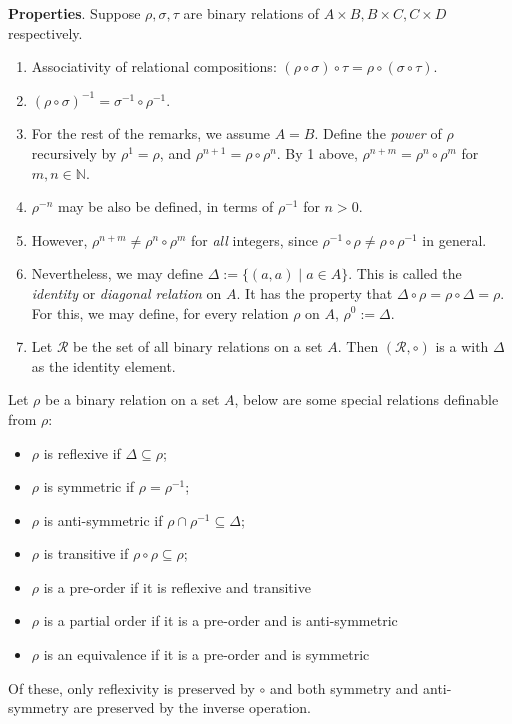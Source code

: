 \documentclass[12pt]{article}
\begin{document}
\textbf{Properties}.
Suppose $\rho,\sigma,\tau$ are binary relations of $A\times B,B\times C,C\times D$ respectively.
\begin{enumerate}
\item Associativity of relational compositions: $(\rho\circ\sigma)\circ \tau =\rho\circ (\sigma\circ\tau)$.
\item $(\rho\circ\sigma)^{-1}=\sigma^{-1}\circ\rho^{-1}$.
\item For the rest of the remarks, we assume $A=B$.  Define the \emph{power} of $\rho$ recursively by $\rho^1=\rho$, and $\rho^{n+1}=\rho\circ\rho^n$.  By 1 above, $\rho^{n+m}=\rho^n\circ\rho^m$ for $m,n\in \mathbb{N}$.
\item $\rho^{-n}$ may be also be defined, in terms of $\rho^{-1}$ for $n>0$.
\item However, $\rho^{n+m}\ne\rho^n\circ\rho^m$ for \emph{all} integers, since $\rho^{-1}\circ\rho\neq \rho\circ\rho^{-1}$ in general.
\item Nevertheless, we may define $\Delta:=\lbrace (a,a)\mid a\in A\rbrace$.  This is called the \emph{identity} or \emph{diagonal relation} on $A$.  It has the property that $\Delta\circ \rho=\rho\circ\Delta=\rho$.  For this, we may define, for every relation $\rho$ on $A$, $\rho^0:=\Delta$.
\item Let $\mathcal{R}$ be the set of all binary relations on a set $A$.  Then $(\mathcal{R},\circ)$ is a  with $\Delta$ as the identity element.
\end{enumerate}

Let $\rho$ be a binary relation on a set $A$, below are some special relations definable from $\rho$:
\begin{itemize}
\item
$\rho$ is reflexive if $\Delta\subseteq\rho$; 
\item 
$\rho$ is symmetric if $\rho=\rho^{-1}$; 
\item
$\rho$ is anti-symmetric if $\rho\cap\rho^{-1}\subseteq \Delta$; 
\item
$\rho$ is transitive if $\rho\circ\rho \subseteq \rho$;
\item
$\rho$ is a pre-order if it is reflexive and transitive  
\item
$\rho$ is a partial order if it is a pre-order and is anti-symmetric
\item
$\rho$ is an equivalence if it is a pre-order and is symmetric
\end{itemize}
Of these, only reflexivity is preserved by $\circ$ and both symmetry and anti-symmetry are preserved by the inverse operation.
\end{document}
